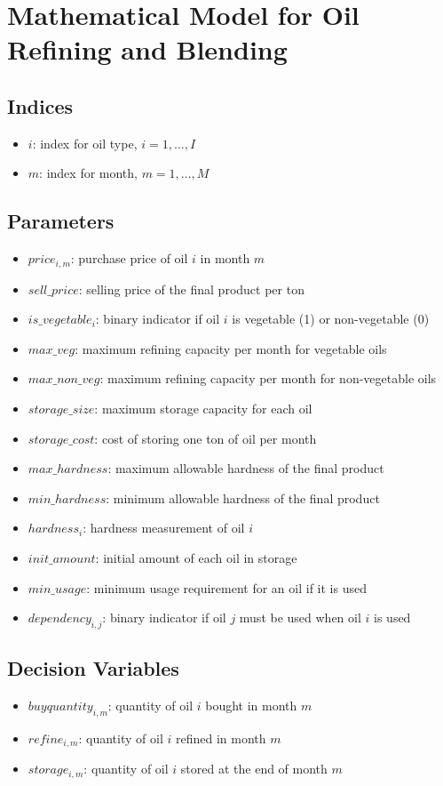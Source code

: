 \documentclass{article}
\begin{document}
\section*{Mathematical Model for Oil Refining and Blending}

\subsection*{Indices}
\begin{itemize}
    \item $i$: index for oil type, $i = 1, \ldots, I$
    \item $m$: index for month, $m = 1, \ldots, M$
\end{itemize}

\subsection*{Parameters}
\begin{itemize}
    \item $price_{i,m}$: purchase price of oil $i$ in month $m$
    \item $sell\_price$: selling price of the final product per ton
    \item $is\_vegetable_{i}$: binary indicator if oil $i$ is vegetable (1) or non-vegetable (0)
    \item $max\_veg$: maximum refining capacity per month for vegetable oils
    \item $max\_non\_veg$: maximum refining capacity per month for non-vegetable oils
    \item $storage\_size$: maximum storage capacity for each oil
    \item $storage\_cost$: cost of storing one ton of oil per month
    \item $max\_hardness$: maximum allowable hardness of the final product
    \item $min\_hardness$: minimum allowable hardness of the final product
    \item $hardness_{i}$: hardness measurement of oil $i$
    \item $init\_amount$: initial amount of each oil in storage
    \item $min\_usage$: minimum usage requirement for an oil if it is used
    \item $dependency_{i,j}$: binary indicator if oil $j$ must be used when oil $i$ is used
\end{itemize}

\subsection*{Decision Variables}
\begin{itemize}
    \item $buyquantity_{i,m}$: quantity of oil $i$ bought in month $m$
    \item $refine_{i,m}$: quantity of oil $i$ refined in month $m$
    \item $storage_{i,m}$: quantity of oil $i$ stored at the end of month $m$
\end{itemize}
\end{document}
